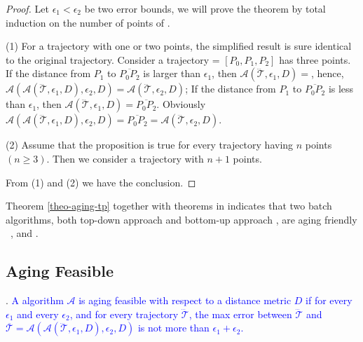 \begin{proof}
Let $\epsilon_1 < \epsilon_2$ be two error bounds, we will prove the theorem by total induction
on the number of points of . 

(1) For a trajectory  with one or two points, the simplified result
is sure identical to the original trajectory. Consider a trajectory  = $[P_0, P_1, P_2]$ has three points. 
%
If the distance from $P_1$ to $\overline{P_0P_2}$ is larger than $\epsilon_1$, then
$\mathcal{A}(\dddot{\mathcal{T}}, \epsilon_1, D)=$, hence, $\mathcal{A}(\mathcal{A}(\dddot{\mathcal{T}}, \epsilon_1, D), \epsilon_2, D)=\mathcal{A}(\dddot{\mathcal{T}}, \epsilon_2, D)$;
%
If the distance from $P_1$ to $\overline{P_0P_2}$ is less than $\epsilon_1$, then
$\mathcal{A}(\dddot{\mathcal{T}}, \epsilon_1, D) = \overline{P_0P_2}$. Obviously $\mathcal{A}(\mathcal{A}(\dddot{\mathcal{T}}, \epsilon_1, D), \epsilon_2, D) =\overline{P_0P_2} = \mathcal{A}(\dddot{\mathcal{T}}, \epsilon_2, D)$.


(2) Assume that the proposition is true for every trajectory  having $n$ points $(n \ge 3)$.
Then we consider a trajectory  with $n+1$ points. 


From (1) and (2) we have the conclusion.
\end{proof}

Theorem \ref{theo-aging-tp} together with theorems in \cite{Cao:Spatio} indicates that two batch algorithms, both top-down approach \dpa and bottom-up approach \tpa, are aging friendly \wrt~\ped, \sed and \dad. 


\subsection{Aging Feasible}

. \textcolor{blue}{A \lsa algorithm $\mathcal{A}$ is aging feasible with respect to a distance metric $D$ if for every $\epsilon_1$ and every $\epsilon_2$, and for every trajectory $\dddot{\mathcal{T}}$, the max error between $\dddot{\mathcal{T}}$ and $\overline{\mathcal{T}}=\mathcal{A}(\mathcal{A}(\dddot{\mathcal{T}}, \epsilon_1, D), \epsilon_2, D)$ is not more than $\epsilon_1+ \epsilon_2$.}


